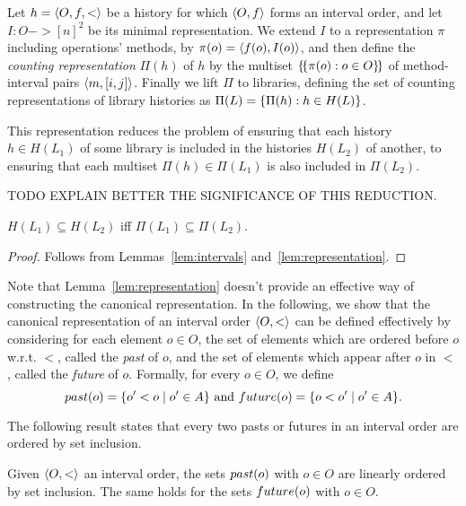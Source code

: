 Let $h = \left\langle {O,f,<} \right\rangle$ be a history for which $\left\langle {O,f} \right\rangle$ forms an interval
order, and let $I : O -> [n]^2$ be its minimal representation. We extend $I$ to
a representation $\pi$ including operations' methods, by $\pi(o) =
\left\langle {f(o),I(o)} \right\rangle$, and then define the \emph{counting representation} $\Pi(h)$
of $h$ by the multiset ${\{\!\{  \pi(o) : o \in O  \}\!\}}$ of method-interval pairs
$\left\langle {m,[i,j]} \right\rangle$. Finally we lift $\Pi$ to libraries, defining the set of
counting representations of library histories as $\Pi(L) = {\{  \Pi(h) : h \in
H(L)  \}}$.

This representation reduces the problem of ensuring that each history $h \in
H(L_1)$ of some library is included in the histories $H(L_2)$ of another, to
ensuring that each multiset $\Pi(h) \in \Pi(L_1)$ is also included in
$\Pi(L_2)$.

TODO EXPLAIN BETTER THE SIGNIFICANCE OF THIS REDUCTION.

\begin{lemma}

  $H(L_1) \subseteq H(L_2)$ iff $\Pi(L_1) \subseteq \Pi(L_2)$.

\end{lemma}

\begin{proof}

  Follows from Lemmas~\ref{lem:intervals} and~\ref{lem:representation}.

\end{proof}

Note that Lemma~\ref{lem:representation} doesn't provide an effective way of constructing the
canonical representation. In the following, we show that the canonical representation of
an interval order $\left\langle {O,<} \right\rangle$ can be defined effectively by considering for each element $o\in O$, 
the set of elements which are ordered before $o$ w.r.t. $<$, called the \emph{past} of $o$, and 
the set of elements which appear after $o$ in $<$, called the \emph{future} of $o$.
Formally, for every $o\in O$, we define
\[
past({o})=\{o' < o\mid o'\in A\}\mbox{ and }future({o})=\{o < o'\mid o'\in A\}.
\]

The following result states that every two pasts or futures in an interval order are ordered by set inclusion.

\begin{lemma}

  Given $\left\langle {O,<} \right\rangle$ an interval order, the sets $past({o})$ with $o\in O$ are
  linearly ordered by set inclusion. The same holds for the sets 
  $future({o})$ with $o\in O$.

\end{lemma}

